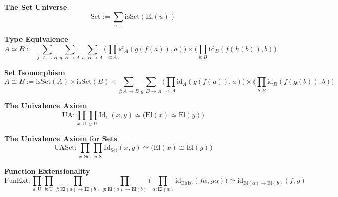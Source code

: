 \textbf{The Set Universe}
$$\text{Set} := \sum_{u : \text{U}} \text{isSet}(\text{El}(u))$$

\textbf{Type Equivalence}
$$A \simeq B := \sum_{f :A \to B}\sum_{g :B \to A}\sum_{h :B \to A}\Big(\prod_{a : A} \text{id}_{A}(g(f(a)),a) \Big) \times \Big(\prod_{b : B} \text{id}_{B}(f(h(b)),b) \Big)$$

\textbf{Set Isomorphism}
$$A \cong B := \text{isSet}(A) \times \text{isSet}(B)\times\sum_{f :A \to B}\sum_{g :B \to A}\Big(\prod_{a : A} \text{id}_{A}(g(f(a)),a) \Big) \times \Big(\prod_{b : B} \text{id}_{B}(f(g(b)),b) \Big)$$

\textbf{The Univalence Axiom}
$$\text{UA}: \prod_{x : \text{U}} \prod_{y : \text{U}} \text{Id}_{\text{U}}(x,y) \simeq \Big(\text{El}(x) \simeq \text{El}(y)\Big)$$

\textbf{The Univalence Axiom for Sets}
$$\text{UASet}: \prod_{x : \text{Set}} \prod_{y : \text{S}} \text{Id}_{\text{Set}}(x,y) \simeq \Big(\text{El}(x) \cong \text{El}(y)\Big)$$

\textbf{Function Extensionality}
$$\text{FunExt}: \prod_{a : \text{U}} \prod_{b : \text{U}} \prod_{f : \text{El}(a) \to \text{El}(b)} \prod_{g : \text{El}(a) \to \text{El}(b)}\Big( \prod_{\alpha : \text{El}(a)}\text{id}_{\text{El(b)}}(f\alpha,g\alpha)\Big) \simeq \text{id}_{\text{El}(a) \to \text{El}(b)}(f,g)$$
